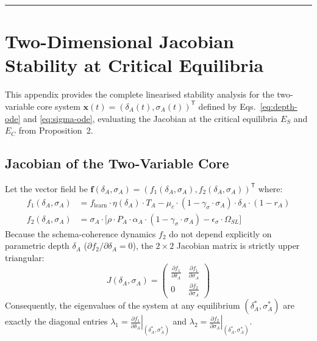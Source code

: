 \documentclass{article}
\theoremstyle{definition}
\begin{document}
\noindent\rule{\linewidth}{0.4pt}

\section{Two-Dimensional Jacobian Stability at Critical Equilibria}\label{app:stability}

This appendix provides the complete linearised stability analysis for the two-variable core system $\mathbf{x}(t) = (\delta_A(t), \sigma_A(t))^{\mathsf{T}}$ defined by Eqs.~\eqref{eq:depth-ode} and \eqref{eq:sigma-ode}, evaluating the Jacobian at the critical equilibria $E_S$ and $E_C$ from Proposition~2.

\subsection{Jacobian of the Two-Variable Core}

Let the vector field be $\mathbf{f}(\delta_A, \sigma_A) = (f_1(\delta_A, \sigma_A), f_2(\delta_A, \sigma_A))^{\mathsf{T}}$ where:
\begin{align}
f_1(\delta_A, \sigma_A) &= f_{\text{learn}} \cdot \eta(\delta_A) \cdot T_A - \mu_c \cdot (1 - \gamma_\sigma \cdot \sigma_A) \cdot \delta_A \cdot (1 - r_A) \\
f_2(\delta_A, \sigma_A) &= \sigma_A \cdot \bigl[ \rho \cdot P_A \cdot \alpha_A \cdot (1 - \gamma_\sigma \cdot \sigma_A) - \epsilon_\sigma \cdot \Omega_{SL} \bigr]
\end{align}
Because the schema-coherence dynamics $f_2$ do not depend explicitly on parametric depth $\delta_A$ ($\partial f_2 / \partial \delta_A = 0$), the $2 \times 2$ Jacobian matrix is strictly upper triangular:
\begin{equation}\label{eq:jacobian-2d}
J(\delta_A, \sigma_A) = \begin{pmatrix}
\frac{\partial f_1}{\partial \delta_A} & \frac{\partial f_1}{\partial \sigma_A} \\
0 & \frac{\partial f_2}{\partial \sigma_A}
\end{pmatrix}
\end{equation}
Consequently, the eigenvalues of the system at any equilibrium $(\delta_A^*, \sigma_A^*)$ are exactly the diagonal entries $\lambda_1 = \left.\frac{\partial f_1}{\partial \delta_A}\right|_{(\delta_A^*, \sigma_A^*)}$ and $\lambda_2 = \left.\frac{\partial f_2}{\partial \sigma_A}\right|_{(\delta_A^*, \sigma_A^*)}$.
\end{document}
